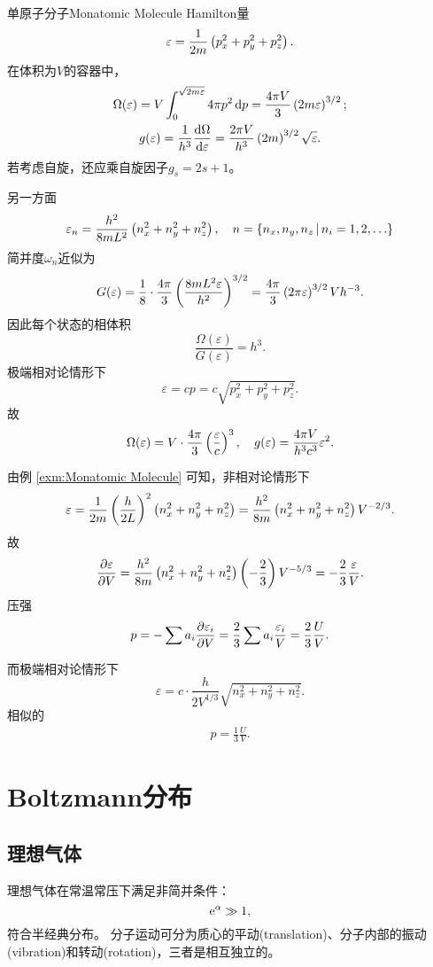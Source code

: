 \begin{example}{单原子分子}{Monatomic Molecule}
	Hamilton量
	\[
		\varepsilon=\frac1{2m}\left(p_x^2+p_y^2+p_z^2\right).
	\]
	在体积为$V$的容器中，
	\begin{gather}\notag
		\Omega(\varepsilon)=V\int_0^{\sqrt{2m\varepsilon}}4\pi p^2\mathop{}\!\mathrm{d} p=\frac{4\pi V}3\left(2m\varepsilon\right)^{3/2};\\
		g(\varepsilon)=\frac1{h^3}\frac{\mathrm{d}^{\;\!\!}\Omega}{\mathrm{d} \varepsilon^{\;\!\!}}=\frac{2\pi V}{h^3}\left(2m\right)^{3/2}\sqrt\varepsilon.
	\end{gather}
	若考虑自旋，还应乘自旋因子$g_s=2s+1$。

	另一方面
	\[
		\varepsilon_n=\frac{h^2}{8mL^2}\left(n_x^2+n_y^2+n_z^2\right),\quad n=\left\{n_x,n_y,n_z\,\middle\vert\,n_i=1,2,\ldots\right\}
	\]
	简并度$\omega_n$近似为
	\[
		G(\varepsilon)=\frac18\cdot\frac{4\pi}3\left(\frac{8mL^2\varepsilon}{h^2}\right)^{3/2}=\frac{4\pi}{3}\left(2\pi\varepsilon\right)^{3/2}Vh^{-3}.
	\]
	因此每个状态的相体积
	\[
		\frac{\Omega(\varepsilon)}{G(\varepsilon)}=h^3.
	\]
	\tcblower
	极端相对论情形下
	\[
		\varepsilon=cp=c\sqrt{p_x^2+p_y^2+p_z^2}.
	\]
	故
	\begin{align}
		\Omega(\varepsilon)=V\cdot\frac{4\pi}3\left(\frac\varepsilon{c}\right)^3,\quad g(\varepsilon)=\frac{4\pi V}{h^3c^3}\varepsilon^2.
	\end{align}
\end{example}
由例 \ref{exm:Monatomic Molecule} 可知，非相对论情形下
\[
	\varepsilon=\frac1{2m}\left(\frac h{2L}\right)^2\left(n_x^2+n_y^2+n_z^2\right)=\frac{h^2}{8m}\left(n_x^2+n_y^2+n_z^2\right)V^{-2/3}.
\]
故
\[
	\frac{\partial^{\;\!\!}\varepsilon}{\partial V^{\;\!\!}}=\frac{h^2}{8m}\left(n_x^2+n_y^2+n_z^2\right)\left(-\frac23\right)V^{-5/3}=-\frac23\frac\varepsilon V.
\]
压强
\begin{align}
	p=-\sum a_i\frac{\partial^{\;\!\!}\varepsilon_i}{\partial V^{\;\!\!}}=\frac23\sum a_i\frac{\varepsilon_i}V=\frac23\frac UV.
\end{align}

而极端相对论情形下
\[
	\varepsilon=c\cdot\frac h{2V^{1/3}}\sqrt{n_x^2+n_y^2+n_z^2}.
\]
相似的
\begin{align}
	p=\frac13\frac UV.
\end{align}
\clearpage
\section{Boltzmann分布}
\subsection{理想气体}
理想气体在常温常压下满足非简并条件：
\[
	\mathop{}\!\mathrm{e}^\alpha\gg 1,
\]
符合半经典分布。%
分子运动可分为质心的平动(translation)、分子内部的振动(vibration)和转动(rotation)，三者是相互独立的。
